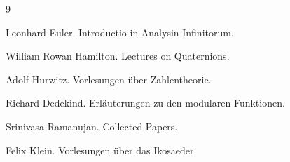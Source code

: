 \documentclass[11pt,a4paper]{article}
\theoremstyle{definition}
\theoremstyle{remark}
\begin{document}
	
	
	\begin{thebibliography}{9}
		
		Leonhard Euler.
		\newblock Introductio in Analysin Infinitorum.
		
		William Rowan Hamilton.
		\newblock Lectures on Quaternions.
		
		Adolf Hurwitz.
		\newblock Vorlesungen über Zahlentheorie.
		
		Richard Dedekind.
		\newblock Erläuterungen zu den modularen Funktionen.
		
		Srinivasa Ramanujan.
		\newblock Collected Papers.
		
		Felix Klein.
		\newblock Vorlesungen über das Ikosaeder.
		
	\end{thebibliography}
	
\end{document}
